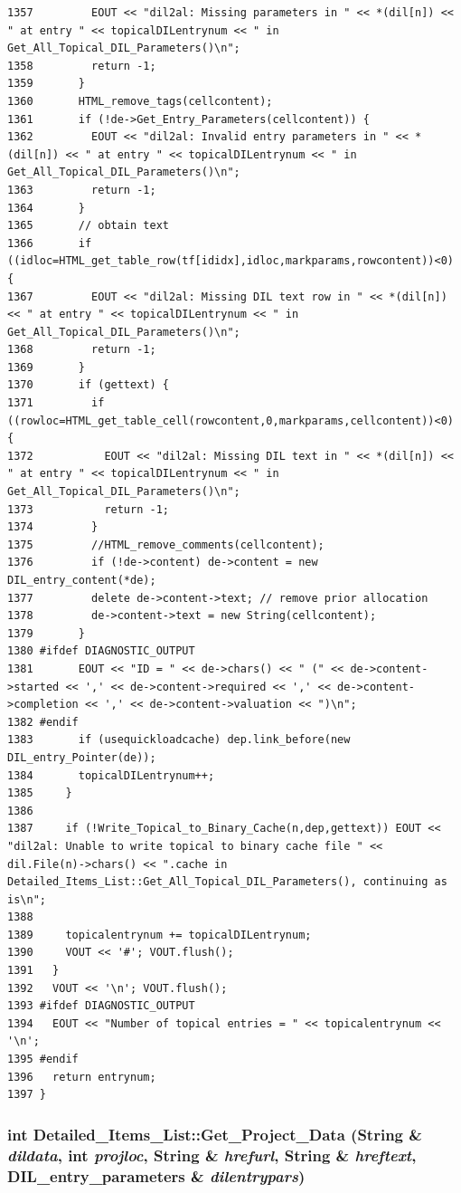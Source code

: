 \begin{verbatim}
1357         EOUT << "dil2al: Missing parameters in " << *(dil[n]) << " at entry " << topicalDILentrynum << " in Get_All_Topical_DIL_Parameters()\n";
1358         return -1;
1359       }
1360       HTML_remove_tags(cellcontent);
1361       if (!de->Get_Entry_Parameters(cellcontent)) {
1362         EOUT << "dil2al: Invalid entry parameters in " << *(dil[n]) << " at entry " << topicalDILentrynum << " in Get_All_Topical_DIL_Parameters()\n";
1363         return -1;
1364       }
1365       // obtain text
1366       if ((idloc=HTML_get_table_row(tf[ididx],idloc,markparams,rowcontent))<0) {
1367         EOUT << "dil2al: Missing DIL text row in " << *(dil[n]) << " at entry " << topicalDILentrynum << " in Get_All_Topical_DIL_Parameters()\n";
1368         return -1;
1369       }
1370       if (gettext) {
1371         if ((rowloc=HTML_get_table_cell(rowcontent,0,markparams,cellcontent))<0) {
1372           EOUT << "dil2al: Missing DIL text in " << *(dil[n]) << " at entry " << topicalDILentrynum << " in Get_All_Topical_DIL_Parameters()\n";
1373           return -1;
1374         }
1375         //HTML_remove_comments(cellcontent);
1376         if (!de->content) de->content = new DIL_entry_content(*de);
1377         delete de->content->text; // remove prior allocation
1378         de->content->text = new String(cellcontent);
1379       }
1380 #ifdef DIAGNOSTIC_OUTPUT
1381       EOUT << "ID = " << de->chars() << " (" << de->content->started << ',' << de->content->required << ',' << de->content->completion << ',' << de->content->valuation << ")\n";
1382 #endif
1383       if (usequickloadcache) dep.link_before(new DIL_entry_Pointer(de));
1384       topicalDILentrynum++;
1385     }
1386 
1387     if (!Write_Topical_to_Binary_Cache(n,dep,gettext)) EOUT << "dil2al: Unable to write topical to binary cache file " << dil.File(n)->chars() << ".cache in Detailed_Items_List::Get_All_Topical_DIL_Parameters(), continuing as is\n";
1388 
1389     topicalentrynum += topicalDILentrynum;
1390     VOUT << '#'; VOUT.flush();
1391   }
1392   VOUT << '\n'; VOUT.flush();
1393 #ifdef DIAGNOSTIC_OUTPUT
1394   EOUT << "Number of topical entries = " << topicalentrynum << '\n';
1395 #endif
1396   return entrynum;
1397 }
\end{verbatim}\normalsize 
{}
\subsubsection{\setlength{\rightskip}{0pt plus 5cm}int Detailed\_\-Items\_\-List::Get\_\-Project\_\-Data ({\bf String} \& {\em dildata}, int {\em projloc}, {\bf String} \& {\em hrefurl}, {\bf String} \& {\em hreftext}, {\bf DIL\_\-entry\_\-parameters} \& {\em dilentrypars})}\label{classDetailed__Items__List_a1}





